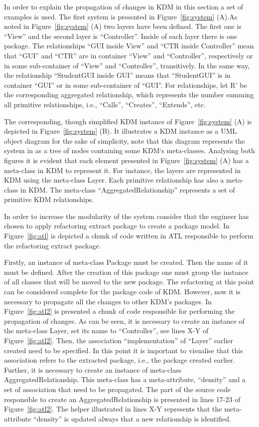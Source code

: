 In order to explain the propagation of changes in KDM in this section a set of examples is used. The first system is presented in Figure~\ref{fig:system} (A).As noted in Figure~\ref{fig:system} (A) two layers have been defined. The first one is ``View'' and the second layer is ``Controller''. Inside of each layer there is one package. The relationships ``GUI inside View'' and ``CTR inside Controller'' mean that ``GUI'' and ``CTR'' are in container ``View'' and ``Controller'', respectively or in some sub-container of  ``View'' and ``Controller'', transitively. In the same way, the relationship ``StudentGUI inside GUI'' means that ``StudentGUI'' is in container ``GUI'' or in some sub-container of ``GUI''. For relationships, let R' be the corresponding aggregated relationship, which represents the number summing all primitive relationships, i.e., ``Calls'', ``Creates'', ``Extends'', etc. 

The corresponding, though simplified KDM instance of Figure~\ref{fig:system} (A) is depicted in Figure~\ref{fig:system} (B). It illustrates a KDM instance as a UML object diagram for the sake of simplicity, note that this diagram represents the system in  as a tree of nodes containing some KDM`s meta-classes. Analysing both figures it is evident that each element presented in Figure~\ref{fig:system} (A) has a meta-class in KDM to represent it. For instance, the layers are represented in KDM using the meta-class Layer. Each primitive relationship has also a meta-class in KDM. The meta-class ``AggregatedRelationship'' represents a set of primitive KDM relationships. 

In order to increase the modularity of the system consider that the engineer has chosen to apply refactoring extract package to create a package model. In Figure~\ref{fig:atl} is depicted a chunk of code written in ATL responsible to perform the refactoring extract package.

Firstly, an instance of meta-class Package must be created. Then the name of it must be defined. After the creation of this package one must group the instance of all classes that will be moved to the new package. The refactoring at this point can be considered complete for the package code of KDM. However, now it is necessary to propagate all the changes to other KDM's packages. In Figure~\ref{fig:atl2} is presented a chunk of code responsible for performing the propagation of changes. As can be seen, it is necessary to create an instance of the meta-class Layer, set its name to ``Controller'', see lines X-Y of Figure~\ref{fig:atl2}. Then, the association ``implementation'' of ``Layer'' earlier created need to be specified. In this point it is important to visualise that this association refers to the extracted package, i.e., the package created earlier. Further, it is necessary to create an instance of meta-class AggregatedRelationship. This meta-class has a meta-attribute, ``density'' and a set of association that need to be propagated. The part of the source code responsible to create an AggregatedRelationship is presented in lines 17-23 of Figure~\ref{fig:atl2}. The helper illustrated in lines X-Y represents that the meta-attribute ``density'' is updated always that a new relationship is identified.




